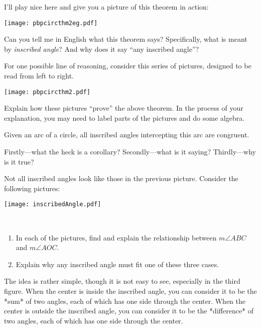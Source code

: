 \documentclass[nooutcomes]{ximera}
\begin{document}
I'll play nice here and give you a picture of this theorem in action:
\begin{image}
\texttt{[image: pbpcircthm2eg.pdf]}
\end{image}

\begin{problem}
Can you tell me in English what this theorem says?  Specifically, what is meant by
\textit{inscribed angle}?  And why does it say ``any inscribed angle''?
\vfill
\end{problem}

\newpage
\begin{problem} 
For one possible line of reasoning, consider this series of pictures, designed to be read from left to right.
\begin{image}
\texttt{[image: pbpcircthm2.pdf]}
\end{image}

Explain how these pictures ``prove'' the above theorem. In the process
of your explanation, you may need to label parts of the pictures and
do some algebra.
\vfill
\end{problem}

\begin{corollary} 
Given an arc of a circle, all inscribed angles intercepting this arc are congruent.
\end{corollary}

\begin{problem} 
Firstly---what the heck is a corollary? Secondly---what is it saying?
Thirdly---why is it true?
\vfill
\end{problem}

\newpage
\begin{problem}
Not all inscribed angles look like those in the previous picture.  Consider the following pictures:  
\begin{image}
\texttt{[image: inscribedAngle.pdf]}
\end{image}
\
\begin{enumerate}
\item In each of the pictures, find and explain the relationship between $m\angle ABC$ and $m\angle AOC$.
\item Explain why any inscribed angle must fit one of these three cases.  
\end{enumerate}
\vfill
\end{problem}

\begin{teachingnote}
The idea is rather simple, though it is not easy to see, especially in the third figure.  When the center is inside the inscribed angle, you can consider it to be the *sum* of two angles, each of which has one side through the center.  When the center is outside the inscribed angle, you can consider it to be the *difference* of two angles, each of which has one side through the center.  
\end{teachingnote}
\end{document}
